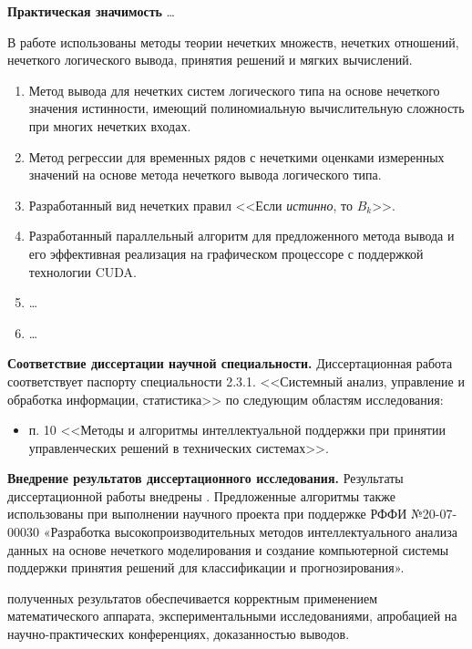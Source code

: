 \textbf{Практическая значимость} \ldots

{\methods} В работе использованы методы теории нечетких множеств, нечетких отношений, нечеткого логического вывода, принятия решений и мягких вычислений.

{}
\begin{enumerate}[beginpenalty=10000] %
  \item Метод вывода для нечетких систем логического типа на основе нечеткого значения истинности, имеющий полиномиальную вычислительную сложность при многих нечетких входах.
  \item Метод регрессии для временных рядов с нечеткими оценками измеренных значений на основе метода нечеткого вывода логического типа.
  \item Разработанный вид нечетких правил <<Если \textit{истинно}, то $B_k$>>.
  \item Разработанный параллельный алгоритм для предложенного метода вывода и его эффективная реализация на графическом процессоре с поддержкой технологии CUDA.
  \item \dots
  \item \dots
\end{enumerate}

\textbf{Соответствие диссертации научной специальности.} Диссертационная работа соответствует паспорту специальности 2.3.1. <<Системный анализ, управление и обработка информации, статистика>> по следующим областям исследования:
\begin{itemize}
  \item п. 10 <<Методы и алгоритмы интеллектуальной поддержки при принятии управленческих решений в технических системах>>.
\end{itemize}

\textbf{Внедрение результатов диссертационного исследования.} Результаты диссертационной работы внедрены \todo{\dots}. Предложенные алгоритмы также использованы при выполнении научного проек­та при поддержке РФФИ №20-07-00030 «Разработка высокопроизводительных методов интеллектуального анализа данных на основе нечеткого моделиро­вания и создание компьютерной системы поддержки принятия решений для классификации и прогнозирования».

{\reliability} полученных результатов обеспечивается корректным применением математического аппарата, экспериментальными исследованиями, апробацией на научно-практических конференциях, доказанностью выводов.

